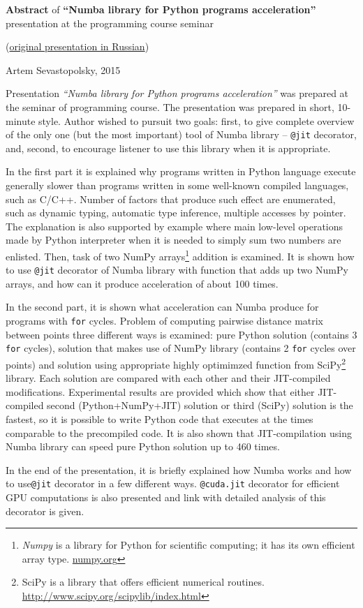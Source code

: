 \documentclass[11pt]{article}
\begin{document}
	{\large {\bf Abstract} of {\bf``Numba library for Python programs acceleration''} presentation at the programming course seminar
	
	 (\href{http://www.machinelearning.ru/wiki/images/0/0a/Numba_presentation.pdf}{original presentation in Russian})
	\newline
	
	{Artem Sevastopolsky, 2015}}
	\newline
	\newline
	\newline
	\par
	Presentation \emph{``Numba library for Python programs acceleration''} was prepared at the seminar of programming course. The presentation was prepared in short, 10-minute style. Author wished to pursuit two goals: first, to give complete overview of the only one (but the most important) tool of Numba library -- \texttt{@jit} decorator, and, second, to encourage listener to use this library when it is appropriate. \newline
	
	In the first part it is explained why programs written in Python language execute generally slower than programs written in some well-known compiled languages, such as C/C++. Number of factors that produce such effect are enumerated, such as dynamic typing, automatic type inference, multiple accesses by pointer. The explanation is also supported by example where main low-level operations made by Python interpreter when it is needed to simply sum two numbers are enlisted. Then, task of two NumPy arrays\footnote{\emph{Numpy} is a library for Python for scientific computing; it has its own efficient array type. \url{numpy.org}} addition is examined. It is shown how to use \texttt{@jit} decorator of Numba library with function that adds up two NumPy arrays, and how can it produce acceleration of about 100 times.
	
	In the second part, it is shown what acceleration can Numba produce for programs with \texttt{for} cycles. Problem of computing pairwise distance matrix between points three different ways is examined: pure Python solution (contains 3 \texttt{for} cycles), solution that makes use of NumPy library (contains 2 \texttt{for} cycles over points) and solution using appropriate highly optimimzed function from SciPy\footnote{SciPy is a library that offers efficient numerical routines. \url{http://www.scipy.org/scipylib/index.html}} library. Each solution are compared with each other and their JIT-compiled modifications. Experimental results are provided which show that either JIT-compiled second (Python+NumPy+JIT) solution or third (SciPy) solution is the fastest, so it is possible to write Python code that executes at the times comparable to the precompiled code. It is also shown that JIT-compilation using Numba library can speed pure Python solution up to 460 times. 
	
	In the end of the presentation, it is briefly explained how Numba works and how to use\texttt{@jit} decorator in a few different ways. \texttt{@cuda.jit} decorator for efficient GPU computations is also presented and link with detailed analysis of this decorator is given.
\end{document}
